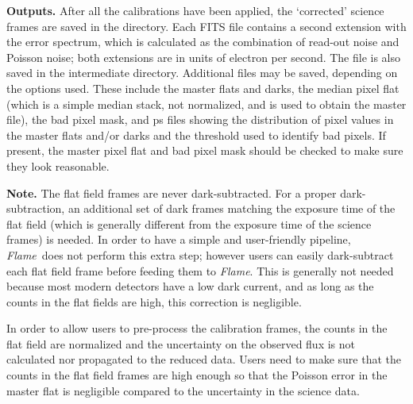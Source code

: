 \documentclass[a4paper]{article}
\newcommand{\flame}{\emph{Flame}}
\begin{document}
\begin{sloppypar}
\medskip
\noindent
\textbf{Outputs.} After all the calibrations have been applied, the `corrected' science frames are saved in the  directory. Each FITS file contains a second extension with the error spectrum, which is calculated as the combination of read-out noise and Poisson noise; both extensions are in units of electron per second. The  file is also saved in the intermediate directory. Additional files may be saved, depending on the options used. These include the master flats and darks, the median pixel flat (which is a simple median stack, not normalized, and is used to obtain the master file), the bad pixel mask, and ps files showing the distribution of pixel values in the master flats and/or darks and the threshold used to identify bad pixels. If present, the master pixel flat and bad pixel mask should be checked to make sure they look reasonable.


\medskip
\noindent
\textbf{Note.} The flat field frames are never dark-subtracted. For a proper dark-subtraction, an additional set of dark frames matching the exposure time of the flat field (which is generally different from the exposure time of the science frames) is needed. In order to have a simple and user-friendly pipeline, \flame\ does not perform this extra step; however users can easily dark-subtract each flat field frame before feeding them to \flame. This is generally not needed because most modern detectors have a low dark current, and as long as the counts in the flat fields are high, this correction is negligible.

In order to allow users to pre-process the calibration frames, the counts in the flat field are normalized and the uncertainty on the observed flux is not calculated nor propagated to the reduced data. Users need to make sure that the counts in the flat field frames are high enough so that the Poisson error in the master flat is negligible compared to the uncertainty in the science data.



\end{sloppypar}
\end{document}
